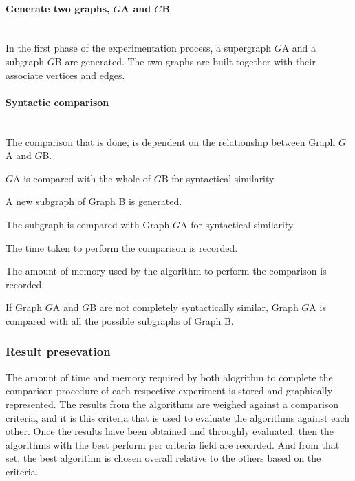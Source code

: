 \paragraph{Generate two graphs, $G${\tiny A} and $G${\tiny B}}\mbox{}\\
In the first phase of the experimentation process, a supergraph $G${\tiny A} and a subgraph $G${\tiny B} are generated. The two graphs are built together 
with their associate vertices and edges.
\paragraph{Syntactic comparison}\mbox{}\\
The comparison that is done, is dependent on the relationship between Graph $G${\tiny A} and $G${\tiny B}.
\begin{myEnumerate}
\item $G${\tiny A} is compared with the whole of $G${\tiny B} for syntactical similarity.										
\begin{myEnumerate}
\item A new subgraph of Graph B is generated.
\item The subgraph is compared with Graph $G${\tiny A} for syntactical similarity.											
\begin{myEnumerate}
\item The time taken to perform the comparison is recorded.
\item The amount of memory used by the algorithm to perform the comparison is recorded.
\end{myEnumerate}
\end{myEnumerate}
\item If Graph $G${\tiny A} and $G${\tiny B} are not completely syntactically similar, Graph $G${\tiny A} is compared with all the possible subgraphs of Graph B.
\end{myEnumerate}

\subsubsection{Result presevation}
The amount of time and memory required by both alogrithm to complete the comparison procedure of each respective experiment is stored and graphically represented. 
The results from the algorithms are weighed against a comparison criteria, and it is this criteria that is used to evaluate the algorithms against each other.\newline
Once the results have been obtained and throughly evaluated, then the algorithms with the best perform per criteria field are recorded.\newline
And from that set, the best algorithm is chosen overall relative to the others based on the criteria.\newpage